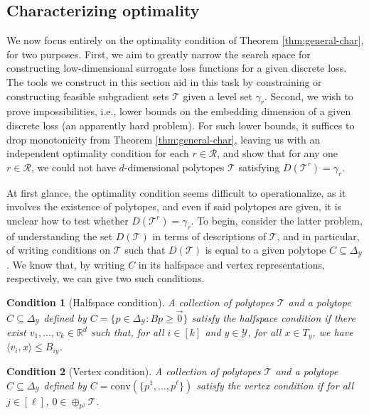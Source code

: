 \documentclass[final]{colt2020} %
\newcommand{\reals}{\mathbb{R}}
\newcommand{\simplex}{\Delta_\Y}
\newcommand{\R}{\mathcal{R}}
\newcommand{\T}{\mathcal{T}}
\newcommand{\Y}{\mathcal{Y}}
\newcommand{\inprod}[2]{\langle #1, #2 \rangle}%
\newcommand{\conv}{\mathrm{conv}}
\newtheorem{condition}{Condition}
\begin{document}
\subsection{Characterizing optimality}\label{subsec:opt-conditions}

We now focus entirely on the optimality condition of Theorem \ref{thm:general-char}, for two purposes.
First, we aim to greatly narrow the search space for constructing low-dimensional surrogate loss functions for a given discrete loss.
The tools we construct in this section aid in this task by constraining or constructing feasible subgradient sets $\T$ given a level set $\gamma_r$.
Second, we wish to prove impossibilities, i.e., lower bounds on the embedding dimension of a given discrete loss (an apparently hard problem).
For such lower bounds, it suffices to drop monotonicity from Theorem \ref{thm:general-char}, leaving us with an independent optimality condition for each $r\in\R$, and show that for any one $r\in\R$, we could not have $d$-dimensional polytopes $\T$ satisfying $D(\T^r) = \gamma_r$.

At first glance, the optimality condition seems difficult to operationalize, as it involves the existence of polytopes, and even if said polytopes are given, it is unclear how to test whether $D(\T^r)=\gamma_r$.
To begin, consider the latter problem, of understanding the set $D(\T)$ in terms of descriptions of $\T$, and in particular, of writing conditions on $\T$ such that $D(\T)$ is equal to a given polytope $C\subseteq\simplex$.
We know that, by writing $C$ in its halfspace and vertex representations, respectively, we can give two such conditions.

\begin{condition}[Halfspace condition]\label{cond:H-condition}
	A collection of polytopes $\T$ and a polytope $C\subseteq\simplex$ defined by $C = \{p \in \simplex : Bp \geq \vec 0\}$ \emph{satisfy the halfspace condition} if there exist $v_1, \ldots, v_k \in \reals^d$ such that, for all $i \in [k]$ and $y \in \Y$, for all $x \in T_y$, we have $\inprod{v_i}{x} \leq B_{iy}$.
\end{condition}
\begin{condition}[Vertex condition]\label{cond:V-condition}
	A collection of polytopes $\T$ and a polytope $C\subseteq\simplex$ defined by $C = \conv(\{p^1, \ldots, p^\ell\})$ \emph{satisfy the vertex condition} if for all $j \in [\ell]$, $0 \in \oplus_{p^j} \T$. %
\end{condition}
\end{document}
